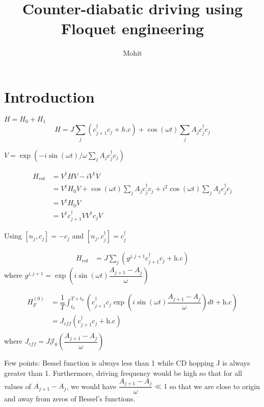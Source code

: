 \documentclass[11pt,a4paper]{article}
\author{Mohit}
\title{Counter-diabatic driving using Floquet engineering  }
\begin{document}
\maketitle

\section{Introduction}
$H= H_0 + H_1$
\begin{equation}
H= J\sum_j (c_{j+1}^{\dagger} c_j + h.c) + \cos(\omega t) \sum_j A_j  c_j^{\dagger} c_j
\end{equation} 

$V=\exp(-i \sin(\omega t)/ \omega \sum_j A_j  c_j^{\dagger} c_j)$ 

\begin{align*}
H_{rot}&= V^{\dagger} H V- i V^{\dagger} \dot{V}\\
&=V^{\dagger} H_0 V + \cos(\omega t) \sum_j A_j  c_j^{\dagger} c_j + i^2 \cos(\omega t) \sum_j A_j  c_j^{\dagger} c_j \\
&=V^{\dagger} H_0 V \\
&=V^{\dagger} c_{j+1}^{\dagger}V V^{\dagger} c_j V 
\end{align*}



Using $[n_j,c_j ]= -c_j$ and $[n_j,c_j^{\dagger} ]= c_j^{\dagger}$

\begin{align*}
H_{rot}&= J\sum_j   ( g^{j, j+1} c_{j+1}^{\dagger} c_j + \mbox{h.c})
\end{align*}
where $g^{j, j+1}= \exp\left(i \sin(\omega t) \dfrac{A_{j+1}- A_j}{\omega}\right)$


\begin{align*}
H_F^{(0)}&= \dfrac{1}{T}   \int_{t_0}^{T+t_0}(c_{j+1}^{\dagger} c_j \exp\left(i \sin(\omega t) \dfrac{A_{j+1}- A_j}{\omega}\right) dt + \mbox{h.c})\\
&= J_{eff} (c_{j+1}^{\dagger} c_j + \mbox{h.c})\\
\end{align*}
where $J_{eff}=J \mathcal{J}_0 \left(\dfrac{A_{j+1}- A_j}{\omega}\right)$

Few points:
Bessel function is always less than 1 while CD hopping J is always greater than 1. Furthermore, driving frequency would be high so that for all values of  $A_{j+1}- A_j$, we would have $\dfrac{A_{j+1}- A_j}{\omega} \ll 1 $ so that we are close to origin and away from zeros of Bessel's functions.
\end{document}
